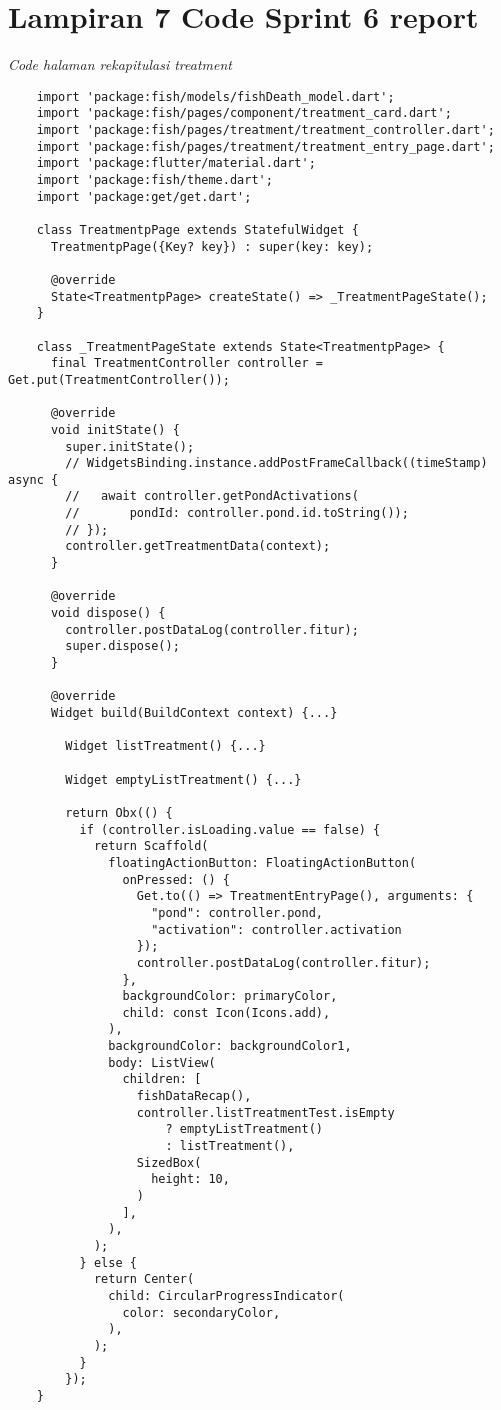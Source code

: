 	
	\clearpage
	\section{Lampiran 7 Code Sprint 6 report}
	\textit{Code halaman rekapitulasi treatment}
	\begin{lstlisting}
    import 'package:fish/models/fishDeath_model.dart';
    import 'package:fish/pages/component/treatment_card.dart';
    import 'package:fish/pages/treatment/treatment_controller.dart';
    import 'package:fish/pages/treatment/treatment_entry_page.dart';
    import 'package:flutter/material.dart';
    import 'package:fish/theme.dart';
    import 'package:get/get.dart';
    
    class TreatmentpPage extends StatefulWidget {
      TreatmentpPage({Key? key}) : super(key: key);
    
      @override
      State<TreatmentpPage> createState() => _TreatmentPageState();
    }
    
    class _TreatmentPageState extends State<TreatmentpPage> {
      final TreatmentController controller = Get.put(TreatmentController());
    
      @override
      void initState() {
        super.initState();
        // WidgetsBinding.instance.addPostFrameCallback((timeStamp) async {
        //   await controller.getPondActivations(
        //       pondId: controller.pond.id.toString());
        // });
        controller.getTreatmentData(context);
      }
    
      @override
      void dispose() {
        controller.postDataLog(controller.fitur);
        super.dispose();
      }
    
      @override
      Widget build(BuildContext context) {...}
    
        Widget listTreatment() {...}
    
        Widget emptyListTreatment() {...}
    
        return Obx(() {
          if (controller.isLoading.value == false) {
            return Scaffold(
              floatingActionButton: FloatingActionButton(
                onPressed: () {
                  Get.to(() => TreatmentEntryPage(), arguments: {
                    "pond": controller.pond,
                    "activation": controller.activation
                  });
                  controller.postDataLog(controller.fitur);
                },
                backgroundColor: primaryColor,
                child: const Icon(Icons.add),
              ),
              backgroundColor: backgroundColor1,
              body: ListView(
                children: [
                  fishDataRecap(),
                  controller.listTreatmentTest.isEmpty
                      ? emptyListTreatment()
                      : listTreatment(),
                  SizedBox(
                    height: 10,
                  )
                ],
              ),
            );
          } else {
            return Center(
              child: CircularProgressIndicator(
                color: secondaryColor,
              ),
            );
          }
        });
    }   
	\end{lstlisting}
	
